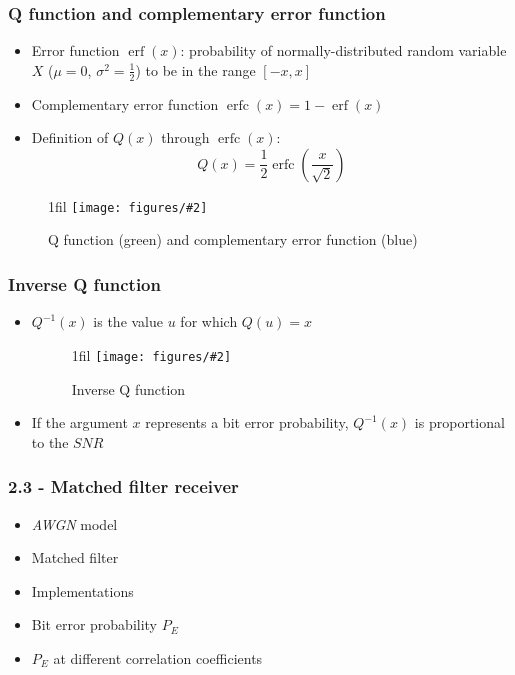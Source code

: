 \documentclass{beamer}
\makeatletter
\newcommand*{\centerfloat}{%
  \parindent \z@
  \leftskip \z@ \@plus 1fil \@minus \textwidth
  \rightskip\leftskip
  \parfillskip \z@skip}
\newcommand{\fig}[3]{
  \begin{figure}[H]
  \centerfloat
    \texttt{[image: figures/\#2]}
	\caption{#3}
  \end{figure}
}
\makeatother
\begin{document}
\begin{frame}
	\frametitle{Q function and complementary error function}
	\begin{itemize}
		\item Error function $\operatorname{erf}(x)$: probability of normally-distributed random variable $X$ ($\mu = 0$, $\sigma^2 = \frac{1}{2}$) to be in the range $[-x, x]$
		\item Complementary error function $\operatorname{erfc}(x) = 1 - \operatorname{erf}(x)$
		\item Definition of $Q(x)$ through $\operatorname{erfc}(x)$:
		\begin{equation}
			Q(x) = \frac{1}{2}\operatorname{erfc} \left(\frac{x}{\sqrt{2}} \right)
		\end{equation}
	\end{itemize}
	\fig{2cm}{q3.png}{Q function (green) and complementary error function (blue)}
\end{frame}

\begin{frame}
	\frametitle{Inverse Q function}
	\begin{itemize}
		\item $Q^{-1}(x)$ is the value $u$ for which $Q(u) = x$
		\fig{2cm}{q2.png}{Inverse Q function}
		\item If the argument $x$ represents a bit error probability, $Q^{-1}(x)$ is proportional to the $SNR$
	\end{itemize}
\end{frame}


\begin{frame}
	\frametitle{2.3 - Matched filter receiver}
	\begin{Large}
		\begin{itemize}
			\item \emph{AWGN} model
			\item Matched filter
			\item Implementations
			\item Bit error probability $P_E$
			\item $P_E$ at different correlation coefficients
		\end{itemize}
	\end{Large}
\end{frame}
\end{document}
